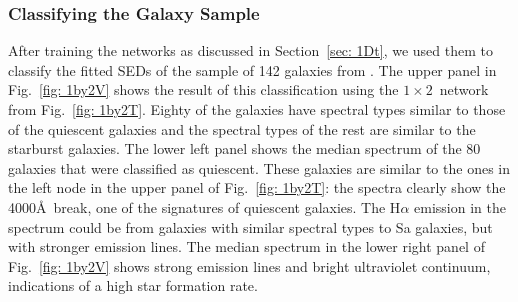         \subsubsection{Classifying the Galaxy Sample}
         \label{sec: 1Dv}
            After training the networks as discussed in Section~\ref{sec: 1Dt}, we used them to classify the fitted SEDs of the sample of 142 galaxies from .
            The upper panel in Fig.~\ref{fig: 1by2V} shows the result of this classification using the $1\times2$~network from Fig.~\ref{fig: 1by2T}.
            Eighty of the galaxies have spectral types similar to those of the quiescent galaxies and the spectral types of the rest are similar to the starburst galaxies.
            The lower left panel shows the median spectrum of the 80 galaxies that were classified as quiescent. 
            These galaxies are similar to the ones in the left node in the upper panel of Fig.~\ref{fig: 1by2T}:
            the spectra clearly show the 4000\AA~break, one of the signatures of quiescent galaxies.
            The H$\alpha$ emission in the spectrum could be from galaxies with similar spectral types to Sa galaxies, but with stronger emission lines.
            The median spectrum in the lower right panel of Fig.~\ref{fig: 1by2V} shows strong emission lines and bright ultraviolet continuum, indications of a high star formation rate.
